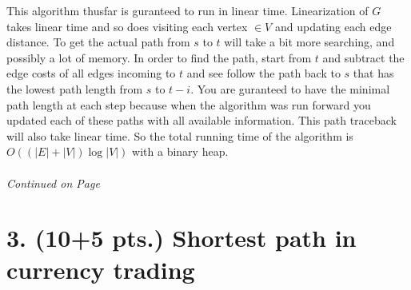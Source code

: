 \documentclass[11pt]{article}
\begin{document}
This algorithm thusfar is guranteed to run in linear time. Linearization of $G$ takes linear time and so does visiting each vertex $\in V$ and updating each edge distance. To get the actual path from $s$ to $t$ will take a bit more searching, and possibly a lot of memory. In order to find the path, start from $t$ and subtract the edge costs of all edges incoming to $t$ and see follow the path back to $s$ that has the lowest path length from $s$ to $t-i$. You are guranteed to have the minimal path length at each step because when the algorithm was run forward you updated each of these paths with all available information. This path traceback will also take linear time. So the total running time of the algorithm is $O((|E|+|V|)\log|V|)$ with a binary heap.

\label{pg:end-of-p2}
%
\paragraph{} \emph{Continued on Page \pageref{pg:p2-continuation}}



\newpage

\section*{3. (10+5 pts.) Shortest path in currency trading}
\end{document}
